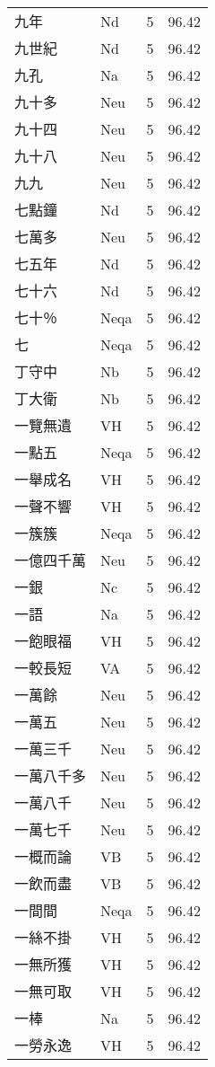 \documentclass[twocolumn]{book}
\begin{document}
\begin{supertabular}{llrr}
九年 & Nd & 5 &  96.42\\
九世紀 & Nd & 5 &  96.42\\
九孔 & Na & 5 &  96.42\\
九十多 & Neu & 5 &  96.42\\
九十四 & Neu & 5 &  96.42\\
九十八 & Neu & 5 &  96.42\\
九九 & Neu & 5 &  96.42\\
七點鐘 & Nd & 5 &  96.42\\
七萬多 & Neu & 5 &  96.42\\
七五年 & Nd & 5 &  96.42\\
七十六 & Nd & 5 &  96.42\\
七十％ & Neqa & 5 &  96.42\\
七 & Neqa & 5 &  96.42\\
丁守中 & Nb & 5 &  96.42\\
丁大衛 & Nb & 5 &  96.42\\
一覽無遺 & VH & 5 &  96.42\\
一點五 & Neqa & 5 &  96.42\\
一舉成名 & VH & 5 &  96.42\\
一聲不響 & VH & 5 &  96.42\\
一簇簇 & Neqa & 5 &  96.42\\
一億四千萬 & Neu & 5 &  96.42\\
一銀 & Nc & 5 &  96.42\\
一語 & Na & 5 &  96.42\\
一飽眼福 & VH & 5 &  96.42\\
一較長短 & VA & 5 &  96.42\\
一萬餘 & Neu & 5 &  96.42\\
一萬五 & Neu & 5 &  96.42\\
一萬三千 & Neu & 5 &  96.42\\
一萬八千多 & Neu & 5 &  96.42\\
一萬八千 & Neu & 5 &  96.42\\
一萬七千 & Neu & 5 &  96.42\\
一概而論 & VB & 5 &  96.42\\
一飲而盡 & VB & 5 &  96.42\\
一間間 & Neqa & 5 &  96.42\\
一絲不掛 & VH & 5 &  96.42\\
一無所獲 & VH & 5 &  96.42\\
一無可取 & VH & 5 &  96.42\\
一棒 & Na & 5 &  96.42\\
一勞永逸 & VH & 5 &  96.42\\

\end{supertabular}
\end{document}
